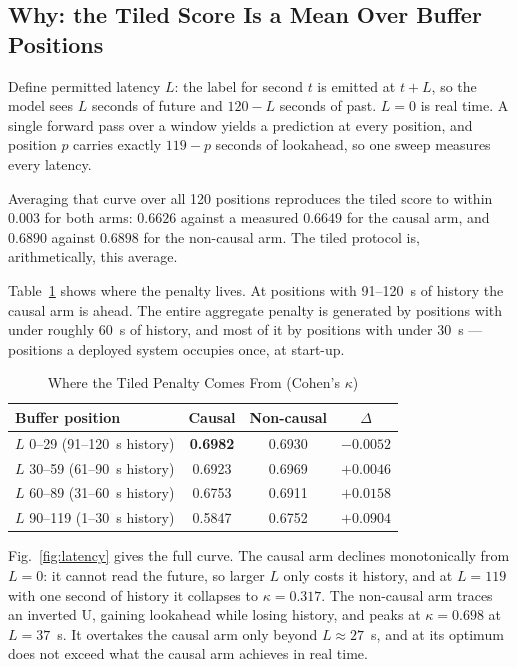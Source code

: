\documentclass[conference]{IEEEtran}
\begin{document}
\subsection{Why: the Tiled Score Is a Mean Over Buffer Positions}

Define permitted latency $L$: the label for second $t$ is emitted at $t+L$, so the model sees $L$
seconds of future and $120 - L$ seconds of past. $L = 0$ is real time. A single forward pass over a
window yields a prediction at every position, and position $p$ carries exactly $119 - p$ seconds of
lookahead, so one sweep measures every latency.

Averaging that curve over all 120 positions reproduces the tiled score to within $0.003$ for both
arms: $0.6626$ against a measured $0.6649$ for the causal arm, and $0.6890$ against $0.6898$ for the
non-causal arm. The tiled protocol is, arithmetically, this average.

Table~\ref{tab:quartile} shows where the penalty lives. At positions with 91--120~s of history the
causal arm is ahead. The entire aggregate penalty is generated by positions with under roughly 60~s
of history, and most of it by positions with under 30~s --- positions a deployed system occupies
once, at start-up.

\begin{table}[t]
\caption{Where the Tiled Penalty Comes From (Cohen's $\kappa$)}
\label{tab:quartile}
\centering
\begin{tabular}{lccc}
\toprule
Buffer position & Causal & Non-causal & $\Delta$ \\
\midrule
$L$ 0--29\hphantom{0} (91--120~s history) & \textbf{0.6982} & 0.6930 & $-0.0052$ \\
$L$ 30--59 (61--90~s history)             & 0.6923 & 0.6969 & $+0.0046$ \\
$L$ 60--89 (31--60~s history)             & 0.6753 & 0.6911 & $+0.0158$ \\
$L$ 90--119 (1--30~s history)             & 0.5847 & 0.6752 & $+0.0904$ \\
\bottomrule
\end{tabular}
\end{table}

Fig.~\ref{fig:latency} gives the full curve. The causal arm declines monotonically from $L = 0$: it
cannot read the future, so larger $L$ only costs it history, and at $L = 119$ with one second of
history it collapses to $\kappa = 0.317$. The non-causal arm traces an inverted U, gaining lookahead
while losing history, and peaks at $\kappa = 0.698$ at $L = 37$~s. It overtakes the causal arm only
beyond $L \approx 27$~s, and at its optimum does not exceed what the causal arm achieves in real
time.
\end{document}
